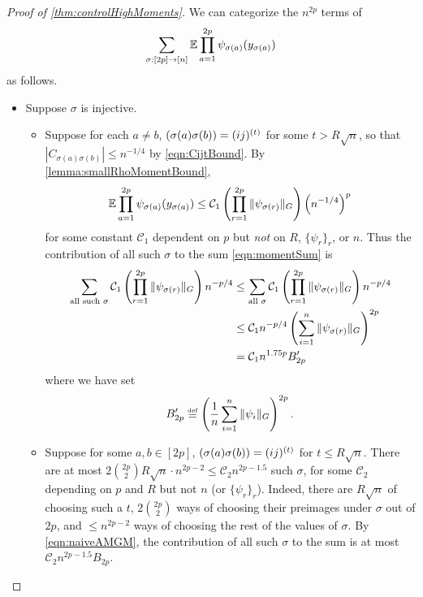 \documentclass[main.tex]{subfiles}
\begin{document}
\begin{proof}[Proof of \cref{thm:controlHighMoments}]
\newcommand{\CC}{\mathcal{C}}

We can categorize the $n^{2p}$ terms of 
\begin{equation}
\sum_{\sigma: [2p] \to [n]} \EV\prod_{a=1}^{2p} \psi_{\sigma(a)}(y_{\sigma(a)})
\label{eqn:momentSum}
\end{equation}
as follows.
\begin{itemize}
    \item Suppose $\sigma$ is injective.
    \begin{itemize}
        \item
            Suppose for each $a\ne b$, $(\sigma(a)\sigma(b)) = (ij)^{(t)}$ for some $t > R\sqrt n$, so that $|C_{\sigma(a)\sigma(b)}| \le n ^{-1/4}$ by \cref{eqn:CijtBound}.
            By \cref{lemma:smallRhoMomentBound}, 
            \[\EV \prod_{a=1}^{2p} \psi_{\sigma(a)}(y_{\sigma(a)}) \le \CC_1 \lp \prod_{r=1}^{2p} \|\psi_{\sigma(r)}\|_G\rp \lp n^{-1/4} \rp ^{p}\]
            for some constant $\CC_1$ dependent on $p$ but \emph{not} on $R$, $\{\psi_r\}_r$, or $n$.
            Thus the contribution of all such $\sigma$ to the sum \cref{eqn:momentSum} is
            \begin{align*}
                \sum_{\text{all such }\sigma} \CC_1 \lp \prod_{r=1}^{2p} \|\psi_{\sigma(r)}\|_G\rp n^{-p/4}
                    &\le
                        \sum_{\text{all }\sigma} \CC_1 \lp \prod_{r=1}^{2p} \|\psi_{\sigma(r)}\|_G\rp n^{-p/4} 
                        \\
                    &\le 
                        \CC_1 n^{-p/4} \lp \sum_{i=1}^{n} \|\psi_{\sigma(r)}\|_G \rp^{2p}
                        \\
                    &=
                        \CC_1 n^{1.75 p} B'_{2p}
            \end{align*}
            where we have set
            \[B'_{2p} \defeq \lp \f 1 n \sum_{i=1}^{n} \|\psi_{i}\|_G \rp^{2p}.
            \]
        \item
            Suppose for some $a, b \in [2p]$, $(\sigma(a)\sigma(b)) = (ij)^{(t)}$ for $t \le R\sqrt n$.
            There are at most $2\binom{2p}2 R \sqrt n \cdot n^{2p-2} \le \CC_2 n^{2p-1.5}$ such $\sigma$, for some $\CC_2$ depending on $p$ and $R$ but not $n$ (or $\{\psi_r\}_r$).
            Indeed, there are $R \sqrt n$ of choosing such a $t$, $2\binom {2p} 2$ ways of choosing their preimages under $\sigma$ out of $2p$, and $\le n^{2p-2}$ ways of choosing the rest of the values of $\sigma$.
            By \cref{eqn:naiveAMGM}, the contribution of all such $\sigma$ to the sum is at most $\CC_2 n^{2p-1.5} B_{2p}.$
            

\end{itemize}
\end{itemize}
\end{proof}
\end{document}
